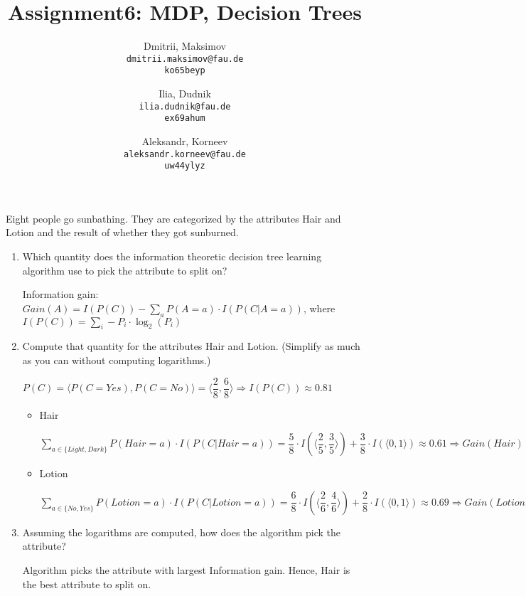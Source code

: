 \documentclass{homework}
\title{Assignment6: MDP, Decision Trees}
\author{
  Dmitrii, Maksimov\\
  \texttt{dmitrii.maksimov@fau.de} \\
  \texttt{ko65beyp}
  \and
  Ilia, Dudnik\\
  \texttt{ilia.dudnik@fau.de}\\
  \texttt{ex69ahum}
  \and
  Aleksandr, Korneev\\
  \texttt{aleksandr.korneev@fau.de}\\
  \texttt{uw44ylyz}
}
\begin{document}
\maketitle

\exercise[6.2 (Sunbathing)]
Eight people go sunbathing. They are categorized by the attributes Hair and Lotion and the result of whether they got sunburned.
\begin{enumerate}
	\item Which quantity does the information theoretic decision tree learning algorithm use to pick the attribute to split on?

	Information gain: $Gain(A)=I(P(C)) - \sum_a P(A=a)\cdot I(P(C|A=a))$, where $I(P(C))=\sum_i -P_i\cdot \log_2(P_i)$
	\item Compute that quantity for the attributes Hair and Lotion. (Simplify as much as you can without computing logarithms.)

	$P(C) = \langle P(C=Yes), P(C=No) \rangle = \langle \dfrac{2}{8}, \dfrac{6}{8} \rangle \Rightarrow I(P(C))\approx 0.81$
	\begin{itemize}
		\item Hair

		$\sum_{a\in \{Light, Dark\}}P(Hair=a)\cdot I(P(C|Hair=a))=\dfrac{5}{8}\cdot I(\langle \dfrac{2}{5}, \dfrac{3}{5} \rangle) + \dfrac{3}{8}\cdot I(\langle 0, 1 \rangle)\approx0.61 \Rightarrow Gain(Hair) = 0.2$
		\item Lotion

		$\sum_{a\in \{No, Yes\}}P(Lotion=a)\cdot I(P(C|Lotion=a))=\dfrac{6}{8}\cdot I(\langle \dfrac{2}{6}, \dfrac{4}{6} \rangle) + \dfrac{2}{8}\cdot I(\langle 0, 1 \rangle)\approx0.69 \Rightarrow Gain(Lotion) = 0.12$
	\end{itemize}
	\item Assuming the logarithms are computed, how does the algorithm pick the attribute?

	Algorithm picks the attribute with largest Information gain. Hence,  Hair is the best attribute to split on.
\end{enumerate}
\end{document}
